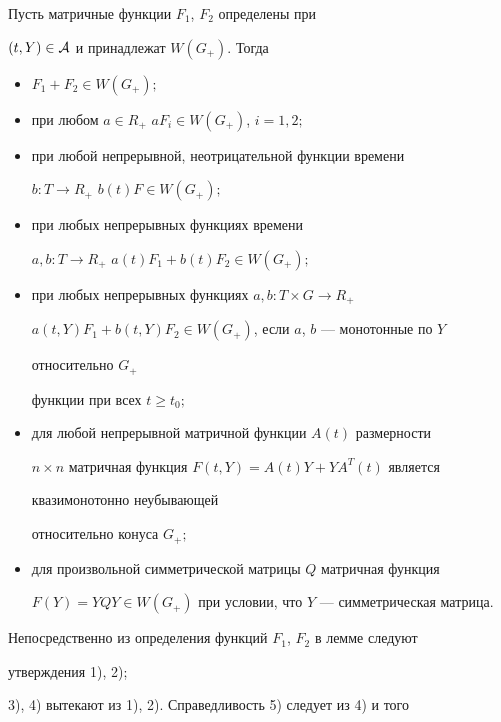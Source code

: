 {\begin{lem}
Пусть матричные функции $F_1$, $F_2$ определены при 


$(t,Y)\in\cal A$ и принадлежат $W(G_+)$. Тогда 


\begin{itemize} 


\item[1)] $F_1+F_2\in W(G_+);$ 


\item[2)] при любом $a\in R_+$\; $a F_i\in W(G_+)$, $i=1,2;$ 


\item[3)] при любой непрерывной, неотрицательной функции времени 


$b:T\to R_+$\; $b(t)F\in W(G_+);$


\item[4)] при любых непрерывных функциях времени 


$a,b:T\to R_+$\; $a(t)F_1+b(t)F_2\in W(G_+);$ 


\item[5)] при любых непрерывных функциях $a,b:T\times G\to R_+$\; 


$a(t,Y)F_1+b(t,Y)F_2\in W(G_+)$, если $a$, $b$ --- монотонные по $Y$ 


относительно $G_+$ 


функции при всех $t\ge t_0;$ 


\item[6)] для любой непрерывной матричной функции $A(t)$ размерности 


$n\times n$ матричная функция $F(t,Y)=A(t)Y+Y A^T(t)$ является 


квазимонотонно неубывающей 


относительно конуса $G_+;$ 


\item[7)] для произвольной симметрической матрицы $Q$ матричная функция 


$F(Y)=Y Q Y\in W(G_+)$ при условии, что $Y$ --- симметрическая матрица. 


\end{itemize} 


\end{lem} 


 


\begin{pf} 


Непосредственно из определения функций $F_1$, $F_2$ в лемме следуют 


утверждения 1), 2); 


3), 4) вытекают из 1), 2). Справедливость 5) следует из 4) и того 



\end{pf}}
